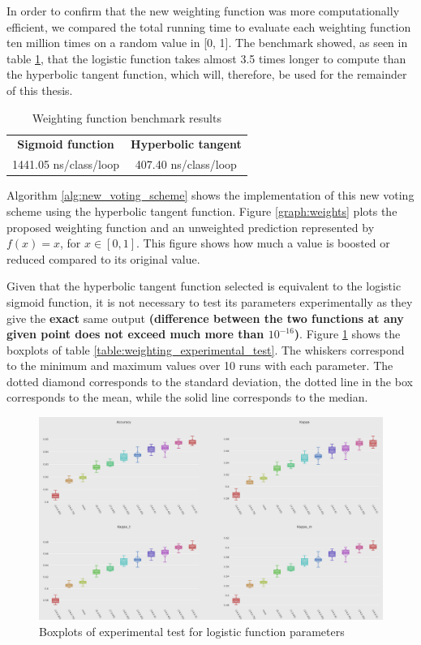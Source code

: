 In order to confirm that the new weighting function was more computationally efficient, we compared the total running time to evaluate each weighting function ten million times on a random value in [0, 1]. The benchmark showed, as seen in table \ref{table:weight_benchmark}, that the logistic function takes almost 3.5 times longer to compute than the hyperbolic tangent function, which will, therefore, be used for the remainder of this thesis.

\begin{table}[]
\centering
\caption{\label{table:weight_benchmark}Weighting function benchmark results}
\begin{tabular}{|c|c|}
\hline
\textbf{Sigmoid function} & \textbf{Hyperbolic tangent} \\ \hhline{==}
1441.05 ns/class/loop & 407.40 ns/class/loop \\ \hline
\end{tabular}
\end{table}

Algorithm \ref{alg:new_voting_scheme} shows the implementation of this new voting scheme using the hyperbolic tangent function. Figure \ref{graph:weights} plots the proposed weighting function and an unweighted prediction represented by $f(x) =x$, for  $x \in [0,1]$. This figure shows how much a value is boosted or reduced compared to its original value.

Given that the hyperbolic tangent function selected is equivalent to the logistic sigmoid function, it is not necessary to test its parameters experimentally as they give the \textbf{exact} same output\textbf{ (difference between the two functions at any given point does not exceed much more than $10^{-16}$)}. Figure \ref{fig:boxplots_params} shows the boxplots of table \ref{table:weighting_experimental_test}. The whiskers correspond to the minimum and maximum values over 10 runs with each parameter. The dotted diamond corresponds to the standard deviation, the dotted line in the box corresponds to the mean, while the solid line corresponds to the median.

\begin{figure}
  \includegraphics[width=\linewidth]{./images/chapter3/boxplots_params}
\caption{\label{fig:boxplots_params}Boxplots of experimental test for logistic function parameters}
\end{figure}


